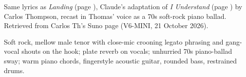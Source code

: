 
\label{sec:landing-soft-rock}
\begin{notes}
Same lyrics as \emph{Landing} (page \pageref{sec:landing}), Claude's adaptation of \emph{I Understand} (page \pageref{sec:i-understand}) by Carlos Thompson, recast in Thomas' voice as a 70s soft-rock piano ballad. Retrieved from Carlos Th's Suno page (V6-MINI, 21 October 2026).
\end{notes}
\begin{style}
Soft rock, mellow male tenor with close-mic crooning legato phrasing and gang-vocal shouts on the hook; plate reverb on vocals; unhurried 70s piano-ballad sway; warm piano chords, fingerstyle acoustic guitar, rounded bass, restrained drums.
\end{style}
